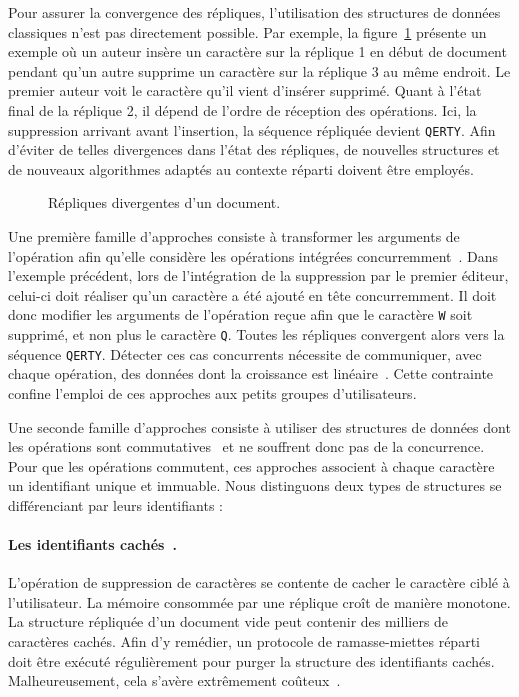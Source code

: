 Pour assurer la convergence des répliques, l'utilisation des structures de
données \og classiques \fg n'est pas directement possible. %
Par exemple, la figure~\ref{intro:fig:ripconvergence} présente un exemple où un
auteur insère un caractère sur la réplique 1 en début de document pendant qu'un
autre supprime un caractère sur la réplique 3 au même endroit. Le premier auteur
voit le caractère qu'il vient d'insérer supprimé. Quant à l'état final de la
réplique 2, il dépend de l'ordre de réception des opérations. Ici, la
suppression arrivant avant l'insertion, la séquence répliquée devient
\texttt{QERTY}.  Afin d'éviter de telles divergences dans l'état des répliques,
de nouvelles structures et de nouveaux algorithmes adaptés au contexte réparti
doivent être employés.


\begin{figure}
  
  \caption{\label{intro:fig:ripconvergence} Répliques divergentes d'un
    document.}
\end{figure}


Une première famille d'approches consiste à transformer les arguments de
l'opération afin qu'elle considère les opérations intégrées
concurremment~\cite{sun1998operational}. Dans l'exemple précédent, lors de
l'intégration de la suppression par le premier éditeur, celui-ci doit réaliser
qu'un caractère a été ajouté en tête concurremment. Il doit donc modifier les
arguments de l'opération reçue afin que le caractère \texttt{W} soit supprimé,
et non plus le caractère \texttt{Q}. Toutes les répliques convergent alors vers
la séquence \texttt{QERTY}.  Détecter ces cas concurrents nécessite de
communiquer, avec chaque opération, des données dont la croissance est
linéaire~\cite{charronbost1991concerning, sun2009contextbased}. Cette contrainte
confine l'emploi de ces approches aux petits groupes d'utilisateurs.

Une seconde famille d'approches consiste à utiliser des structures de données
dont les opérations sont commutatives~\cite{shapiro2011conflict} et ne souffrent
donc pas de la concurrence. Pour que les opérations commutent, ces approches
associent à chaque caractère un identifiant unique et immuable. Nous distinguons
deux types de structures se différenciant par leurs identifiants :

\paragraph{Les identifiants cachés~\cite{oster2006data}.} L'opération de
suppression de caractères se contente de cacher le caractère ciblé à
l'utilisateur. La mémoire consommée par une réplique croît de manière
monotone. %
La structure répliquée d'un document vide peut contenir des milliers de
caractères cachés.  Afin d'y remédier, un protocole de ramasse-miettes
réparti~\cite{abdullahi1998garbage} doit être exécuté régulièrement pour purger
la structure des identifiants cachés. Malheureusement, cela s'avère extrêmement
coûteux~\cite{abdullahi1998garbage}.

